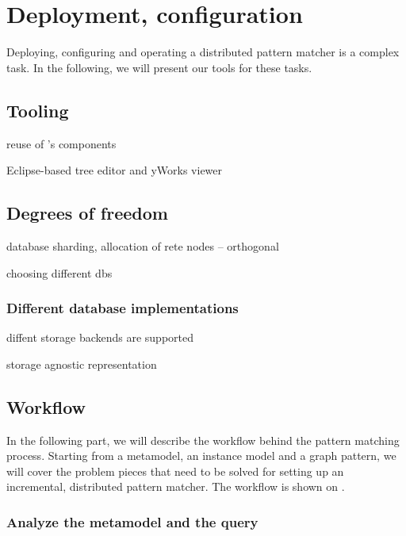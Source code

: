 \section{Deployment, configuration}
\label{sec:deployment-configuration}

Deploying, configuring and operating a distributed pattern matcher is a complex task. In the following, we will present our tools for these tasks. 

\subsection{Tooling}



reuse of \eiq's components

Eclipse-based tree editor and yWorks viewer





\subsection{Degrees of freedom}

database sharding, allocation of rete nodes -- orthogonal

choosing different dbs

\subsubsection{Different database implementations}

diffent storage backends are supported

storage agnostic representation



\subsection{Workflow} %
\label{subsec:workflow}

In the following part, we will describe the workflow behind the pattern matching process. Starting from a metamodel, an instance model and a graph pattern, we will cover the problem pieces that need to be solved for setting up an incremental, distributed pattern matcher. The workflow is shown on .


\subsubsection{Analyze the metamodel and the query}


